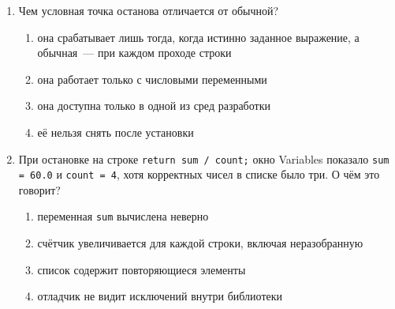 \begin{enumerate}
\item Чем условная точка останова отличается от обычной?
  \begin{enumerate}
    \item[а)] она срабатывает лишь тогда, когда истинно заданное выражение, а
              обычная~--- при каждом проходе строки
    \item[б)] она работает только с числовыми переменными
    \item[в)] она доступна только в одной из сред разработки
    \item[г)] её нельзя снять после установки
  \end{enumerate}

\item При остановке на строке \texttt{return sum / count;} окно Variables
      показало \texttt{sum = 60.0} и \texttt{count = 4}, хотя корректных чисел
      в списке было три. О чём это говорит?
  \begin{enumerate}
    \item[а)] переменная \texttt{sum} вычислена неверно
    \item[б)] счётчик увеличивается для каждой строки, включая неразобранную
    \item[в)] список содержит повторяющиеся элементы
    \item[г)] отладчик не видит исключений внутри библиотеки
  \end{enumerate}

\end{enumerate}
